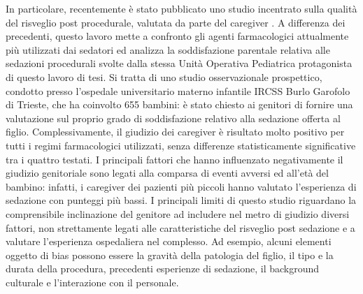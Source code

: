 In particolare, recentemente è stato pubblicato uno studio incentrato sulla qualità del risveglio post procedurale, valutata da parte del caregiver \citep{Cortellazzo2022}. A differenza dei precedenti, questo lavoro mette a confronto gli agenti farmacologici attualmente più utilizzati dai sedatori ed analizza la soddisfazione parentale relativa alle sedazioni procedurali svolte dalla stessa Unità Operativa Pediatrica protagonista di questo lavoro di tesi. Si tratta di uno studio osservazionale prospettico, condotto presso l'ospedale universitario materno infantile IRCSS Burlo Garofolo di Trieste, che ha coinvolto 655 bambini: è stato chiesto ai genitori di fornire una valutazione sul proprio grado di soddisfazione relativo alla sedazione offerta al figlio. Complessivamente, il giudizio dei caregiver è risultato molto positivo per tutti i regimi farmacologici utilizzati, senza differenze statisticamente significative tra i quattro testati. I principali fattori che hanno influenzato negativamente il giudizio genitoriale sono legati alla comparsa di eventi avversi ed all’età del bambino: infatti, i caregiver dei pazienti più piccoli hanno valutato l’esperienza di sedazione con punteggi più bassi. I principali limiti di questo studio riguardano la comprensibile inclinazione del genitore ad includere nel metro di giudizio diversi fattori, non strettamente legati alle caratteristiche del risveglio post sedazione e a valutare l’esperienza ospedaliera nel complesso. Ad esempio, alcuni elementi oggetto di bias possono essere la gravità della patologia del figlio, il tipo e la durata della procedura, precedenti esperienze di sedazione, il background culturale e l’interazione con il personale. 




